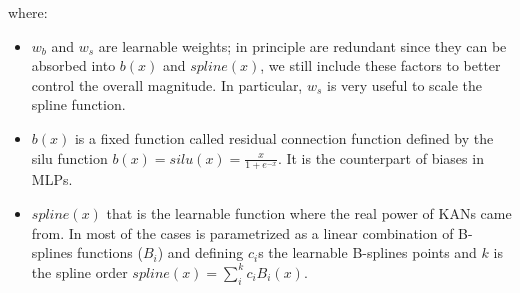 where:
\begin{itemize}
    \item $w_b$ and $w_s$ are learnable weights; in principle are redundant since they can be absorbed into $b(x)$ and $spline(x)$, we still include these factors to better control the overall magnitude. In particular, $w_s$ is very useful to scale the spline function.
    \item $b(x)$ is a fixed function called residual connection function defined by the silu function $b(x) = silu(x) = \frac{x}{1+e^{-x}}$. It is the counterpart of biases in MLPs.
    \item $spline(x)$ that is the learnable function where the real power of KANs came from. In most of the cases is parametrized as a linear combination of B-splines functions ($B_i$) and defining $c_i$s the learnable B-splines points and $k$ is the spline order $spline(x)= \sum_i^k c_iB_i(x)$.
\end{itemize}
